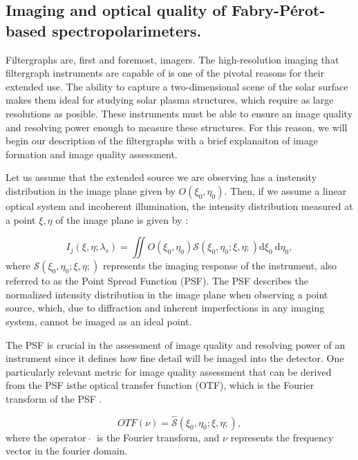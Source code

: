\subsection{Imaging and optical quality of Fabry-Pérot-based spectropolarimeters.\label{sec: intro-imaging}}

Filtergraphs are, first and foremost, imagers. The high-resolution imaging that filtergraph instruments are capable of is one of the pivotal reasons for their extended use. The ability to capture a two-dimensional scene of the solar surface makes them ideal for studying solar plasma structures, which require as large resolutions as posible. These instruments must be able to ensure an image quality and resolving power enough to measure these structures. For this reason, we will begin our description of the filtergraphs with a brief explanaiton of image formation and image quality assessment. 

Let us assume that the extended source we are observing has a instensity distribution in the image plane given by $O(\xi _ 0, \eta _ 0)$. Then, if we assume a linear optical system and incoherent illumination, the intensity distribution measured at a point $\xi, \eta$ of the image plane is given by : 

\begin{equation}
  I_ j\left(\xi, \eta ; \lambda_{s}\right)= \iint  O\left(\xi_0, \eta_0\right)  \mathcal{S}\left(\xi_0, \eta_0; \xi , \eta;\right)  \mathrm{d} \xi_{0} \mathrm{~d} \eta_{0},
  \label{eq_imaging: intensity_simple}
\end{equation}
where $\mathcal{S}\left(\xi_0, \eta_0; \xi , \eta;\right)$ represents the imaging response of the instrument, also referred to as the Point Spread Function (PSF). The PSF describes the normalized intensity distribution in the image plane when observing a point source, which, due to diffraction and inherent imperfections in any imaging system, cannot be imaged as an ideal point.

The PSF is crucial in the assessment of image quality and resolving power of an instrument since it defines how fine detail will be imaged into the detector. One particularly relevant metric for image quality assessment that can be derived from the PSF isthe optical transfer function (OTF), which is the Fourier transform of the PSF \citep{vargas_tesis}. 

\begin{equation}
  OTF(\nu) = \hat{\mathcal{S}}\left(\xi_0, \eta_0; \xi , \eta;\right),
\end{equation}
where the operator  $\ \hat{ }\ $  is the Fourier transform, and $\nu$ represents the frequency vector in the fourier domain.

